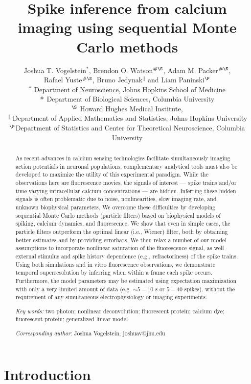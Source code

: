 \documentclass[10pt]{article}
\title{Spike inference from calcium imaging using sequential Monte Carlo methods}%
\author{Joshua T. Vogelstein$^\ast$, Brendon O. Watson$^{\#\S}$,  Adam M. Packer$^{\#\S}$, \\ Rafael Yuste$^{\#\S}$, Bruno Jedynak$^{||}$ and Liam Paninski$^\P$ \\  $^\ast$ Department of Neuroscience, Johns Hopkins School of Medicine \\ $^\#$ Department of Biological Sciences, Columbia University \\ $^\S$ Howard Hughes Medical Institute, \\
$^{||}$ Department of Applied Mathematics and Statistics, Johns Hopkins University \\
$^\P$Department of Statistics and Center for Theoretical Neuroscience, Columbia University}
\begin{document}
\maketitle
\begin{abstract}

As recent advances in calcium sensing technologies facilitate simultaneously imaging action potentials in neuronal populations, complementary analytical tools must also be developed to maximize the utility of this experimental paradigm. While the observations here are fluorescence movies, the signals of interest --- spike trains and/or time varying intracellular calcium concentrations --- are hidden.  Inferring these hidden signals is often problematic due to noise, nonlinearities, slow imaging rate, and unknown biophysical parameters. We overcome these difficulties by developing sequential Monte Carlo methods (particle filters) based on biophysical models of spiking, calcium dynamics, and fluorescence. We show that even in simple cases, the particle filters outperform the optimal linear (i.e., Wiener) filter, both by obtaining better estimates and by providing errorbars. We then relax a number of our model assumptions to incorporate nonlinear saturation of the fluorescence signal, as well external stimulus and spike history dependence (e.g., refractoriness) of the spike trains. Using both simulations and in vitro fluorescence observations, we demonstrate temporal superresolution by inferring when within a frame each spike occurs. Furthermore, the model parameters may be estimated using expectation maximization with only a very limited amount of data (e.g. $\sim 5-10$ s or $5-40$ spikes), without the requirement of any simultaneous electrophysiology or imaging experiments.

\emph{Key words:} two photon; nonlinear deconvolution; fluorescent protein; calcium dye; fluorescent protein; generalized linear model 

\emph{Corresponding author}: Joshua Vogelstein, joshuav@jhu.edu

\end{abstract}

\newpage
\pagestyle{myheadings}


\section*{Introduction}
\end{document}
